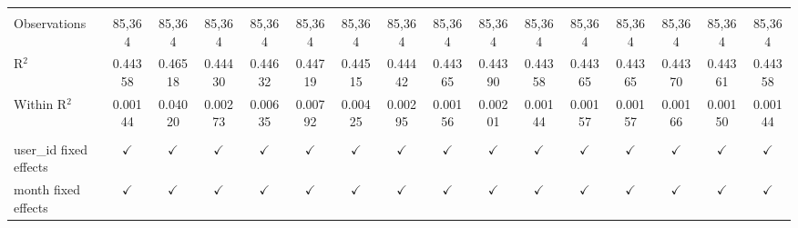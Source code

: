 \begin{table}[htbp]
\begin{tiny}
\begin{tabular}{lccccccccccccccc}
                                  &                 &                 &                 &                 &                 &                 &                 &                 &                 &                 &                 &                 &                 &                 &  \\
         Observations             & 85,364          & 85,364          & 85,364          & 85,364          & 85,364          & 85,364          & 85,364          & 85,364          & 85,364          & 85,364          & 85,364          & 85,364          & 85,364          & 85,364          & 85,364\\
         R$^2$                    & 0.44358         & 0.46518         & 0.44430         & 0.44632         & 0.44719         & 0.44515         & 0.44442         & 0.44365         & 0.44390         & 0.44358         & 0.44365         & 0.44365         & 0.44370         & 0.44361         & 0.44358\\
         Within R$^2$             & 0.00144         & 0.04020         & 0.00273         & 0.00635         & 0.00792         & 0.00425         & 0.00295         & 0.00156         & 0.00201         & 0.00144         & 0.00157         & 0.00157         & 0.00166         & 0.00150         & 0.00144\\
                                  &                 &                 &                 &                 &                 &                 &                 &                 &                 &                 &                 &                 &                 &                 &  \\
         user\_id fixed effects  & $\checkmark$   & $\checkmark$   & $\checkmark$   & $\checkmark$   & $\checkmark$   & $\checkmark$   & $\checkmark$   & $\checkmark$   & $\checkmark$   & $\checkmark$   & $\checkmark$   & $\checkmark$   & $\checkmark$   & $\checkmark$   & $\checkmark$\\
         month fixed effects      & $\checkmark$   & $\checkmark$   & $\checkmark$   & $\checkmark$   & $\checkmark$   & $\checkmark$   & $\checkmark$   & $\checkmark$   & $\checkmark$   & $\checkmark$   & $\checkmark$   & $\checkmark$   & $\checkmark$   & $\checkmark$   & $\checkmark$\\
         \bottomrule
      \end{tabular}
   \end{tiny}
\end{table}


